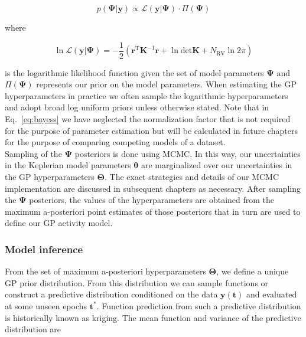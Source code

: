 \begin{equation}
  p(\boldsymbol{\Psi}|\mathbf{y}) \propto \mathcal{L}(\mathbf{y}|\boldsymbol{\Psi}) \cdot
  \Pi(\boldsymbol{\Psi})
  \label{eq:bayess}
\end{equation}

\noindent where

\begin{equation}
  \ln{\mathcal{L}}(\mathbf{y}|\boldsymbol{\Psi}) =
  -\frac{1}{2} \left( \mathbf{r}^{\text{T}} \mathbf{K}^{-1} \mathbf{r} +
  \ln{\text{det}\mathbf{K}} + N_{\text{RV}} \ln{2\pi} \right)
  \label{eq:lnlikeGP}
\end{equation}

\noindent is the logarithmic likelihood function given the set of model parameters
$\boldsymbol{\Psi}$ and $\Pi(\boldsymbol{\Psi})$ represents our prior on
the model parameters. When estimating the GP hyperparameters in practice we
often sample the logarithmic hyperparameters and adopt broad log uniform priors
unless otherwise stated. Note that in Eq.~\ref{eq:bayess}
we have neglected the normalization factor that is not required
for the purpose of parameter estimation but will be calculated in future 
chapters for the purpose of comparing competing models of a dataset. \\

Sampling of the $\boldsymbol{\Psi}$ posteriors is done using MCMC. In this way, our
uncertainties in the Keplerian model parameters $\boldsymbol{\theta}$
are marginalized over our uncertainties in
the GP hyperparameters $\boldsymbol{\Theta}$. The exact strategies and details of
our MCMC implementation are discussed in subsequent chapters
as necessary. After sampling the $\boldsymbol{\Psi}$ posteriors, the values of the
hyperparameters are obtained from the maximum a-posteriori point estimates of those
posteriors that in turn are used to define our GP activity model.

\subsubsection{Model inference}
From the set of maximum a-posteriori hyperparameters $\boldsymbol{\Theta}$,
we define a unique GP prior distribution. From this distribution we can sample
functions or construct a predictive distribution
conditioned on the data $\mathbf{y}(\mathbf{t})$ and evaluated at some unseen
epochs $\mathbf{t}^*$. Function prediction from such a predictive distribution is
historically known as kriging. The mean function and variance of the
predictive distribution are

